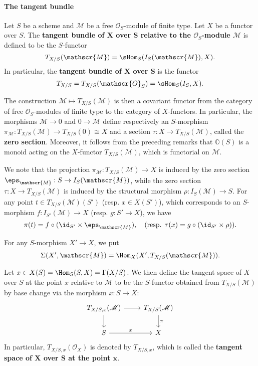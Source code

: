 \paragraph{The tangent bundle}
\begin{definition}
Let $S$ be a scheme and $\mathscr{M}$ be a free $\mathscr{O}_S$-module of finite type. Let $X$ be a functor over $S$. The \textbf{tangent bundle of $\bm{X}$ over $\bm{S}$ relative to the $\mathscr{O}_S$-module $\mathscr{M}$} is defined to be the $S$-functor
\[T_{X/S}(\mathscr{M})=\sHom_S(I_S(\mathscr{M}),X).\]
In particular, the \textbf{tangent bundle of $\bm{X}$ over $\bm{S}$} is the functor
\[T_{X/S}=T_{X/S}(\mathscr{O}_S)=\sHom_S(I_S,X).\]
\end{definition}

The construction $\mathscr{M}\mapsto T_{X/S}(\mathscr{M})$ is then a covariant functor from the category of free $\mathscr{O}_S$-modules of finite type to the category of $X$-functors. In particular, the morphisms $\mathscr{M}\to 0$ and $0\to\mathscr{M}$ define respectively an $S$-morphism $\pi_\mathscr{M}:T_{X/S}(\mathscr{M})\to T_{X/S}(0)\cong X$ and a section $\tau:X\to T_{X/S}(\mathscr{M})$, called the \textbf{zero section}. Moreover, it follows from the preceding remarks that $\mathbb{O}(S)$ is a monoid acting on the $X$-functor $T_{X/S}(\mathscr{M})$, which is functorial on $\mathscr{M}$.

\begin{remark}\label{scheme tangent bundle projection zero section char}
We note that the projection $\pi_\mathscr{M}:T_{X/S}(\mathscr{M})\to X$ is induced by the zero section $\eps_\mathscr{M}:S\to I_S(\mathscr{M})$, while the zero section $\tau:X\to T_{X/S}(\mathscr{M})$ is induced by the structural morphism $\rho:I_S(\mathscr{M})\to S$. For any point $t\in T_{X/S}(\mathscr{M})(S')$ (resp. $x\in X(S')$), which corresponds to an $S$-morphism $f:I_{S'}(\mathscr{M})\to X$ (resp. $g:S'\to X$), we have 
\[\pi(t)=f\circ(\id_{S'}\times\eps_\mathscr{M}),\quad  \text{(resp. $\tau(x)=g\circ(\id_{S'}\times\rho)$)}.\]
\end{remark}

\begin{remark}
For any $S$-morphism $X'\to X$, we put
\[\Sigma(X',\mathscr{M})=\Hom_X(X',T_{X/S}(\mathscr{M})).\]
\end{remark}

\begin{definition}
Let $x\in X(S)=\Hom_S(S,X)=\Gamma(X/S)$. We then define the tangent space of $X$ over $S$ at the point $x$ relative to $\mathscr{M}$ to be the $S$-functor obtained from $T_{X/S}(\mathscr{M})$ by base change via the morphism $x:S\to X$:
\[\begin{tikzcd}
T_{X/S,x}(\mathscr{M})\ar[r]\ar[d]&T_{X/S}(\mathscr{M})\ar[d,"\pi"]\\
S\ar[r,"x"]&X
\end{tikzcd}\]
In particular, $T_{X/S,x}(\mathscr{O}_X)$ is denoted by $T_{X/S,x}$, which is called the \textbf{tangent space of $\bm{X}$ over $\bm{S}$ at the point $\bm{x}$}.
\end{definition}

